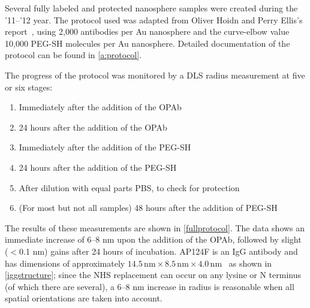 Several fully labeled and protected nanosphere samples were created during the '11--'12 year. The protocol used was adapted from Oliver Hoidn and Perry Ellis's report~\citep{hoidnellis}, using 2,000 antibodies per Au nanosphere and the curve-elbow value 10,000 PEG-SH molecules per Au nanosphere. Detailed documentation of the protocol can be found in \autoref{a:protocol}.

The progress of the protocol was monitored by a DLS radius measurement at five or six stages:

\begin{enumerate}
\item Immediately after the addition of the OPAb

\item 24 hours after the addition of the OPAb

\item Immediately after the addition of the PEG-SH

\item 24 hours after the addition of the PEG-SH

\item After dilution with equal parts PBS, to check for protection

\item (For most but not all samples) 48 hours after the addition of PEG-SH

\end{enumerate}

The results of these measurements are shown in \autoref{fullprotocol}. The data shows an immediate increase of 6--8 nm upon the addition of the OPAb, followed by slight ($<$0.1 nm) gains after 24 hours of incubation. AP124F is an IgG antibody and has dimensions of approximately $14.5\mathrm{\,nm}\times8.5\mathrm{\,nm}\times4.0\mathrm{\,nm}$~\citep{antibodylength} as shown in \autoref{iggstructure};
since the NHS replacement can occur on any lysine or N terminus (of which there are several), a 6--8 nm increase in radius is reasonable when all spatial orientations are taken into account.

